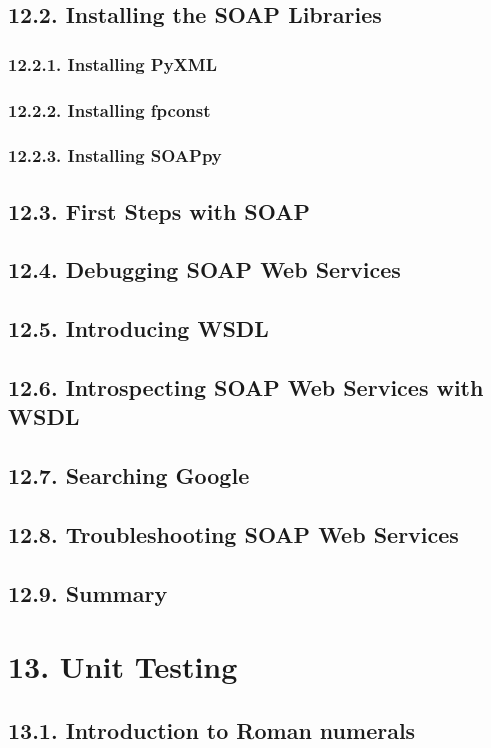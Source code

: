 \documentclass[oneside,12pt]{book}
\begin{document}
\section{12.2. Installing the SOAP Libraries}
\subsection{12.2.1. Installing PyXML}
\subsection{12.2.2. Installing fpconst}
\subsection{12.2.3. Installing SOAPpy}
       
\section{12.3. First Steps with SOAP}
\section{12.4. Debugging SOAP Web Services}
\section{12.5. Introducing WSDL}
\section{12.6. Introspecting SOAP Web Services with WSDL}
\section{12.7. Searching Google}
\section{12.8. Troubleshooting SOAP Web Services}
\section{12.9. Summary}
   
\chapter{13. Unit Testing}
\section{13.1. Introduction to Roman numerals}
\end{document}
